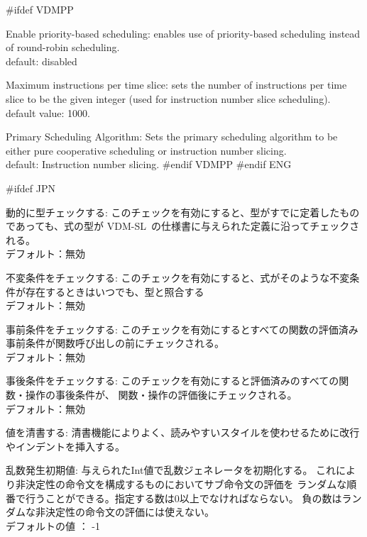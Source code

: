 \documentclass[\pformat,12pt]{article}
\newcommand{\vdmslpp}{VDM-SL}
\newcommand{\vdmslpp}{VDM++}
\newcommand{\guicmd}[1]{{\sf #1}}
\newcommand{\guicmd}[1]{{\gt #1}}
\begin{document}
\begin{list}{}{}
#ifdef VDMPP
\item[\textsf{Enable priority-based scheduling}:] enables use of
  priority-based scheduling instead of round-robin scheduling.\\
  default: disabled
  
\item[\textsf{Maximum instructions per time slice}:]
  sets the number of instructions per time slice to be the given
  integer (used for instruction number slice scheduling).\\
  default value: 1000.
  
\item[\textsf{Primary Scheduling Algorithm}:]
  Sets the primary scheduling algorithm to be either
  pure cooperative scheduling or instruction number slicing.\\
  default: Instruction number slicing.
#endif VDMPP
#endif ENG

#ifdef JPN
\item[{\guicmd{動的に型チェックする}}:]
  このチェックを有効にすると、型がすでに定着したものであっても、式の型が 
  \vdmslpp\ の仕様書に与えられた定義に沿ってチェックされる。 \\
  デフォルト：無効

\item[{\guicmd{不変条件をチェックする}}:]
  このチェックを有効にすると、式がそのような不変条件が存在するときはいつでも、型と照合する \\
  デフォルト：無効
  
\item[{\guicmd{事前条件をチェックする}}:]
  このチェックを有効にするとすべての関数の評価済み事前条件が関数呼び出しの前にチェックされる。 \\
  デフォルト：無効
  
\item[{\guicmd{事後条件をチェックする}}:]
  このチェックを有効にすると評価済みのすべての関数・操作の事後条件が、
  関数・操作の評価後にチェックされる。 \\
  デフォルト：無効
  
\item[{\guicmd{値を清書する}}:]
  清書機能によりよく、読みやすいスタイルを使わせるために改行やインデントを挿入する。
  
\item[{\guicmd{乱数発生初期値}}:]
与えられたInt値で乱数ジェネレータを初期化する。
これにより非決定性の命令文を構成するものにおいてサブ命令文の評価を
ランダムな順番で行うことができる。指定する数は0以上でなければならない。
負の数はランダムな非決定性の命令文の評価には使えない。 \\
デフォルトの値 ： -1


\end{list}
\end{document}

